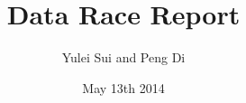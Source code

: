 \documentclass[a4paper,11pt]{article}
\begin{document}
\title{Data Race Report}
\author{Yulei Sui and Peng Di}
\date{May 13th 2014}
\maketitle






\end{document}
